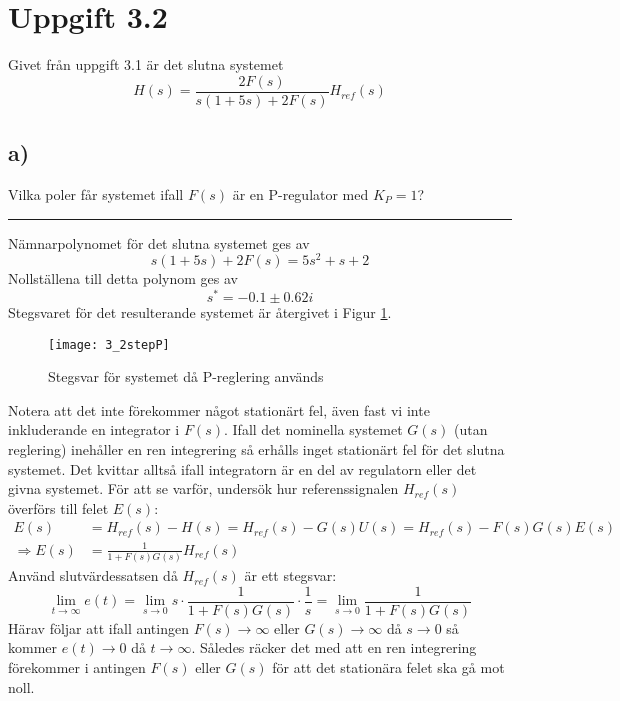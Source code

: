 \documentclass[12pt]{article}
\newcommand{\qline}{\hrule \vspace*{10pt}}
\begin{document}
\section*{Uppgift 3.2}
Givet från uppgift 3.1 är det slutna systemet
\begin{equation*}
  H(s) = \frac{2F(s)}{s(1+5s)+2F(s)} H_{ref}(s)
\end{equation*}
\subsection*{a)}
Vilka poler får systemet ifall $F(s)$ är en P-regulator med $K_P = 1$?
\qline
Nämnarpolynomet för det slutna systemet ges av
\[s(1+5s) + 2F(s) = 5s^2 + s + 2\]
Nollställena till detta polynom ges av
\[s^* = -0.1 \pm 0.62i\]
Stegsvaret för det resulterande systemet är återgivet i Figur \ref{fig:32stepP}.
\begin{figure}[h!]
  \centering
  \texttt{[image: 3\_2stepP]}
  \caption{Stegsvar för systemet då P-reglering används}
\label{fig:32stepP}
\end{figure}
\FloatBarrier
Notera att det inte förekommer något stationärt fel, även fast vi inte inkluderande en integrator i $F(s)$. Ifall det nominella systemet $G(s)$ (utan reglering) inehåller en ren integrering så erhålls inget stationärt fel för det slutna systemet. Det kvittar alltså ifall integratorn är en del av regulatorn eller det givna systemet. För att se varför, undersök hur referenssignalen $H_{ref}(s)$ överförs till felet $E(s)$: \\
\begin{align*}
  E(s) &= H_{ref}(s) - H(s) = H_{ref}(s) - G(s)U(s) = H_{ref}(s) - F(s)G(s)E(s) \\
  \Rightarrow E(s) &= \frac{1}{1+F(s)G(s)}H_{ref}(s)
\end{align*}
Använd slutvärdessatsen då $H_{ref}(s)$ är ett stegsvar:
\begin{equation*}
  \lim_{t \to \infty} e(t) = \lim_{s \to 0}s \cdot \frac{1}{1 + F(s)G(s)} \cdot \frac{1}{s} = \lim_{s \to 0} \frac{1}{1 + F(s)G(s)}
\end{equation*}
Härav följar att ifall antingen $F(s) \to \infty$ eller $G(s) \to \infty$ då $s \to 0$ så kommer $e(t) \to 0$ då $t \to \infty$. Således räcker det med att en ren integrering förekommer i antingen $F(s)$ eller $G(s)$ för att det stationära felet ska gå mot noll.
\end{document}
